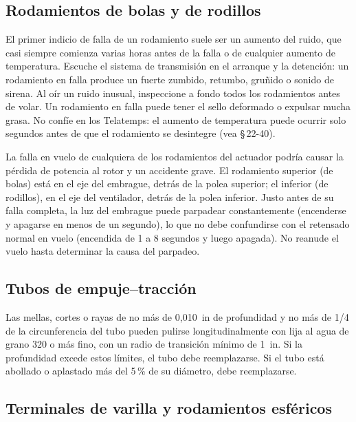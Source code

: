 \subsection{Rodamientos de bolas y de rodillos}

El primer indicio de falla de un rodamiento suele ser un aumento del ruido, que casi siempre comienza varias horas antes de la falla o de cualquier aumento de temperatura. Escuche el sistema de transmisión en el arranque y la detención: un rodamiento en falla produce un fuerte zumbido, retumbo, gruñido o sonido de sirena. Al oír un ruido inusual, inspeccione a fondo todos los rodamientos antes de volar. Un rodamiento en falla puede tener el sello deformado o expulsar mucha grasa. No confíe en los Telatemps: el aumento de temperatura puede ocurrir solo segundos antes de que el rodamiento se desintegre (vea \S\,22-40).

La falla en vuelo de cualquiera de los rodamientos del actuador podría causar la pérdida de potencia al rotor y un accidente grave. El rodamiento superior (de bolas) está en el eje del embrague, detrás de la polea superior; el inferior (de rodillos), en el eje del ventilador, detrás de la polea inferior. Justo antes de su falla completa, la luz del embrague puede parpadear constantemente (encenderse y apagarse en menos de un segundo), lo que no debe confundirse con el retensado normal en vuelo (encendida de 1 a 8 segundos y luego apagada). No reanude el vuelo hasta determinar la causa del parpadeo.

\subsection{Tubos de empuje--tracción}

Las mellas, cortes o rayas de no más de 0,010~in de profundidad y no más de 1/4 de la circunferencia del tubo pueden pulirse longitudinalmente con lija al agua de grano 320 o más fino, con un radio de transición mínimo de 1~in. Si la profundidad excede estos límites, el tubo debe reemplazarse. Si el tubo está abollado o aplastado más del 5\,\% de su diámetro, debe reemplazarse.

\subsection{Terminales de varilla y rodamientos esféricos}

\begin{checklist}
\end{checklist}

